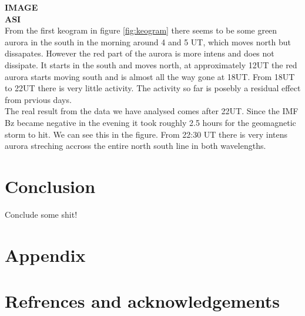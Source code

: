 \documentclass[norsk,a4paper,12pt]{article}
\begin{document}
\begin{multicols}{2}
\textbf{IMAGE}\\


\textbf{ASI}\\
From the first keogram in figure \ref{fig:keogram} there seems to be some green aurora in the south in the morning around 4 and 5 UT, which moves north but dissapates. However the red part of the aurora is more intens and does not dissipate. It starts in the south and moves north, at approximately 12UT the red aurora starts moving south and is almost all the way gone at 18UT. From 18UT to 22UT there is very little activity. The activity so far is posebly a residual effect from prvious days.
\\
The real result from the data we have analysed comes after 22UT. Since the IMF Bz became negative in the evening it took roughly 2.5 hours for the geomagnetic storm to hit. We can see this in the figure. From 22:30 UT there is very intens aurora streching accross the entire north south line in both wavelengths.











\section{Conclusion} %
\label{sec:conclusion}

Conclude some shit!



\section{Appendix} %
\label{sec:appendix}


\section{Refrences and acknowledgements} %
\label{sec:refrences_and_acknowledgements}






\end{multicols}
\end{document}
